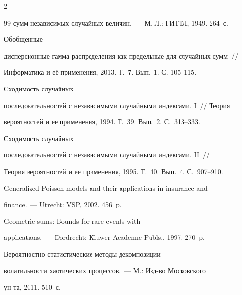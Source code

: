 \begin{multicols}{2}
{{\begin{thebibliography}{99}
сумм независимых случайных величин.~--- М.-Л.: ГИТТЛ, 1949. 264~с.





  Обобщенные


дисперсионные гамма-распределения как предельные для случайных сумм~// 


Информатика и её применения, 2013. Т.~7. Вып.~1. С. 105--115.





  Сходимость случайных


последовательностей с независимыми случайными индексами. I~// Теория


вероятностей и ее применения, 1994. Т.~39. Вып.~2. С.~313--333.





  Сходимость случайных


последовательностей с независимыми случайными индексами. II~//


Теория вероятностей и ее применения, 1995. Т.~40. Вып.~4. С.~907--910.





 


Generalized Poisson models and their applications in insurance and


finance.~--- Utrecht: VSP, 2002. 456~p.







 Geometric sums: Bounds for rare events with


applications.~--- Dordrecht: Kluwer Academic Publs., 1997. 270~p.







 Ве\-ро\-ят\-ност\-но-ста\-ти\-сти\-че\-ские методы декомпозиции


волатильности хаотических процессов.~--- М.: Изд-во Московского


ун-та, 2011. 510~с.






\end{thebibliography}}}
\end{multicols}
